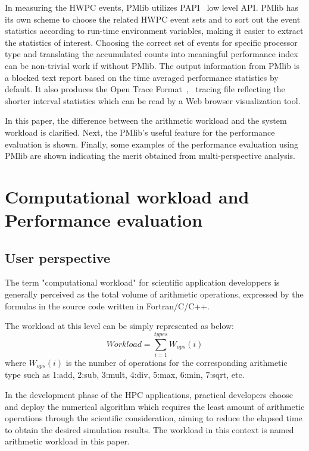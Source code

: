 \documentclass[conference]{IEEEtran}
\begin{document}
In measuring the HWPC events, PMlib utilizes PAPI~\cite{PAPI:5.6} low level API.
PMlib has its own scheme to choose the related HWPC event sets and to sort out
the event statistics according to run-time environment variables, making it
easier to extract the statistics of interest.
Choosing the correct set of events for specific processor type and
translating the accumulated counts into meaningful performance index can be
non-trivial work if without PMlib.
The output information from PMlib is a blocked text report based on
the time averaged performance statistics by default.
It also produces the
Open Trace Format~\cite{Knupfer:2006},~\cite{OTF:webpage-public}
tracing file reflecting
the shorter interval statistics which can be read by a Web browser
visualization tool.  %

In this paper, the difference between the arithmetic workload and the system
workload is clarified.
Next, the PMlib's useful feature for the performance evaluation is shown.
Finally, some examples of the performance evaluation using PMlib
are shown indicating the merit obtained from multi-perspective analysis.

\section{Computational workload and Performance evaluation}
\label{workload-evaluation}

%
\subsection{User perspective}
\label{subsection:user-perspective}

The term "computational workload" for scientific application developpers
is generally perceived as the total volume of arithmetic operations,
expressed by the formulas in the source code written in Fortran/C/C++.

The workload at this level can be simply represented as below:
\begin{equation}\label{eq:arithmetic-workload}
	Workload = \sum_{i=1}^{types} W_{ops}(i)
\end{equation}
where $ W_{ops}(i) $ is the number of operations for the
corresponding arithmetic type such as
1:add, 2:sub, 3:mult, 4:div, 5:max, 6:min, 7:sqrt, etc.

In the development phase of the HPC applications, practical developers
choose and deploy the numerical algorithm which requires the least
amount of arithmetic operations through the scientific consideration,
aiming to reduce the elapsed time to obtain the desired simulation results.
The workload in this context is named arithmetic workload in this paper.
\end{document}
